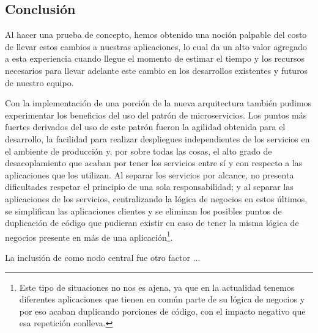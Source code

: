 \subsection{Conclusión}
\label{conclusion}

Al hacer una prueba de concepto, hemos obtenido una noción palpable del costo de llevar estos cambios a nuestras aplicaciones, lo cual da un alto valor agregado a esta experiencia cuando llegue el momento de estimar el tiempo y los recursos necesarios para llevar adelante este cambio en los desarrollos existentes y futuros de nuestro equipo.

Con la implementación de una porción de la nueva arquitectura también pudimos experimentar los beneficios del uso del patrón de microservicios. Los puntos más fuertes derivados del uso de este patrón fueron la agilidad obtenida para el desarrollo, la facilidad para realizar despliegues independientes de los servicios en el ambiente de producción y, por sobre todas las cosas, el alto grado de desacoplamiento que acaban por tener los servicios entre sí y con respecto a las aplicaciones que los utilizan. Al separar los servicios por alcance, no presenta dificultades respetar el principio de una sola responsabilidad; y al separar las aplicaciones de los servicios, centralizando la lógica de negocios en estos últimos, se simplifican las aplicaciones clientes y se eliminan los posibles puntos de duplicación de código que pudieran existir en caso de tener la misma lógica de negocios presente en más de una aplicación\footnote{Este tipo de situaciones no nos es ajena, ya que en la actualidad tenemos diferentes aplicaciones que tienen en común parte de su lógica de negocios y por eso acaban duplicando porciones de código, con el impacto negativo que esa repetición conlleva.}.

La inclusión de  como nodo central fue otro factor ...

